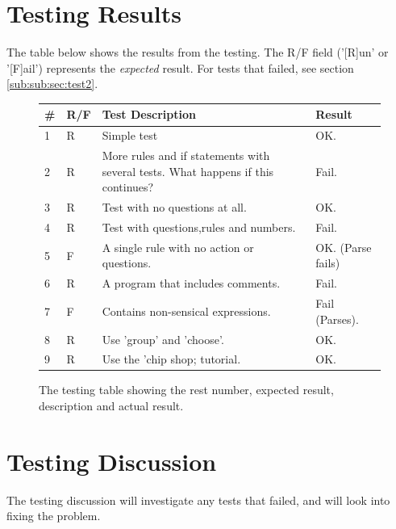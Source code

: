 \documentclass[12pt]{report}
\begin{document}
\section{Testing Results}\label{sec:testing_results}
The table below shows the results from the testing.  The R/F field ('[R]un' or '[F]ail') represents the \textit{expected} result.  For tests that failed, see section \ref{sub:sub:sec:test2}.
\begin{figure}[H]
	\begin{tabular}{| l | l | p{270pt} | p{110pt} |}
		\hline
		\textbf{\#} & \textbf{R/F} & \textbf{Test Description} & \textbf{Result} \\ \hline
		1 & R & Simple test & OK. \\ \hline
		2 & R & More rules and if statements with several tests. What happens if this continues? & Fail. \\ \hline
		3 & R & Test with no questions at all. & OK. \\ \hline
		4 & R & Test with questions,rules and numbers. & Fail. \\ \hline
		5 & F & A single rule with no action or questions. & OK. (Parse fails) \\ \hline
		6 & R & A program that includes comments. & Fail. \\ \hline
		7 & F & Contains non-sensical expressions. & Fail (Parses). \\ \hline
		8 & R & Use 'group' and 'choose'. & OK. \\ \hline
		9 & R & Use the 'chip shop; tutorial. & OK. \\ \hline
	\end{tabular}
	\caption{The testing table showing the rest number, expected result, description and actual result.}\label{fig:results_table}
\end{figure}
\section{Testing Discussion}\label{sec:testing_discussion}
The testing discussion will investigate any tests that failed, and will look into fixing the problem.
\end{document}
